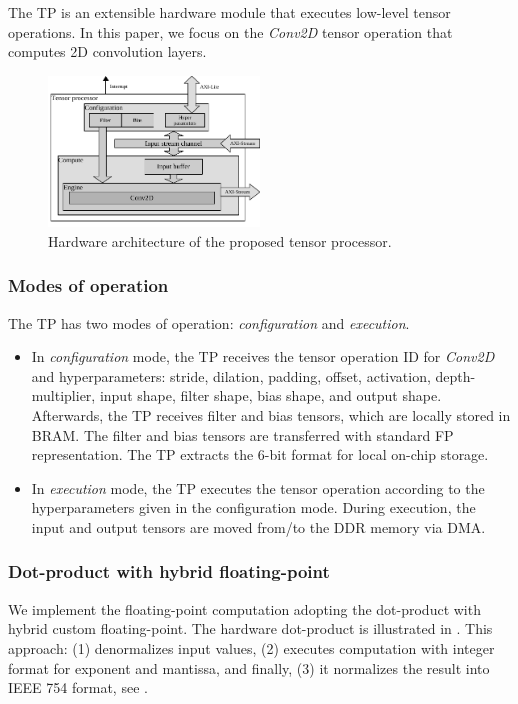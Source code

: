 The TP is an extensible hardware module that executes low-level tensor operations. In this paper, we focus on the \emph{Conv2D} tensor operation that computes 2D convolution layers.

\begin{figure}[t!]
	\centering
	\includegraphics[width=0.5\textwidth]{../figures/accelerator.pdf}
	\caption{Hardware architecture of the proposed tensor processor.}
	\label{fig:accelerator}
\end{figure}
\subsubsection{\textbf{Modes of operation}}
The TP has two modes of operation: \emph{configuration} and \emph{execution}.
\begin{itemize}
	\item In \emph{configuration} mode, the TP receives the tensor operation ID for \emph{Conv2D} and hyperparameters: stride, dilation, padding, offset, activation, depth-multiplier, input shape, filter shape, bias shape, and output shape. Afterwards, the TP receives filter and bias tensors, which are locally stored in BRAM. The filter and bias tensors are transferred with standard FP representation. The TP extracts the 6-bit format for local on-chip storage.
	
	\item In \emph{execution} mode, the TP executes the tensor operation according to the hyperparameters given in the configuration mode. During execution, the input and output tensors are moved from/to the DDR memory via DMA.
\end{itemize}
\subsubsection{\textbf{Dot-product with hybrid floating-point}}
\label{sec:dot_product}
We implement the floating-point computation adopting the dot-product with hybrid custom floating-point\cite{nevarez2021accelerating}. The hardware dot-product is illustrated in . This approach: (1) denormalizes input values, (2) executes computation with integer format for exponent and mantissa, and finally, (3) it normalizes the result into IEEE 754 format, see . 

